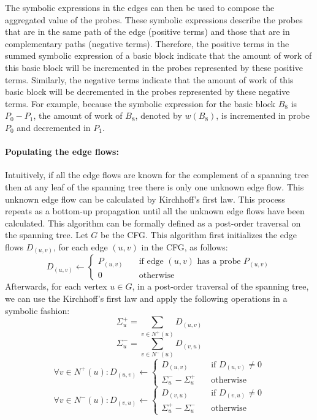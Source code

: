 The symbolic expressions in the edges can then be used to compose the aggregated
value of the probes.
These symbolic expressions describe the probes that are in the same path of the
edge (positive terms) and those that are in complementary paths (negative
terms).
Therefore, the positive terms in the summed symbolic expression of a
basic block indicate that the amount of work of this basic block will be
incremented in the probes represented by these positive terms.
Similarly, the negative terms indicate that the amount of work of this basic block
will be decremented in the probes represented by these negative terms.
For example, because the symbolic expression for the basic block $B_8$ is $P_0 - P_1$,
the amount of work of $B_8$, denoted by $w(B_8)$, is incremented in probe $P_0$
and decremented in $P_1$.

\paragraph{Populating the edge flows:}
Intuitively, if all the edge flows are known for the complement of a spanning tree then at any leaf of the spanning tree there is only one
unknown edge flow. This unknown edge flow can be calculated by Kirchhoff's first law\FIXME{\cite{}}. This process repeats as a bottom-up
propagation until all the unknown edge flows have been calculated. This algorithm can be formally defined as a post-order traversal on the
spanning tree. Let $G$ be the CFG. This algorithm first initializes the edge flows $D_{(u,v)}$, for each edge $(u,v)$ in the CFG, as
follows:
\[
D_{(u,v)} \gets
\begin{cases}
    P_{(u,v)} & \quad \text{if edge $(u,v)$ has a probe $P_{(u,v)}$}\\
    0       & \quad \text{otherwise}
\end{cases}
\]
Afterwards, for each vertex $u\in G$, in a post-order traversal of the spanning tree,
we can use the Kirchhoff's first law and apply the following operations
in a symbolic fashion:
\[
\Sigma^+_u = \sum_{v\in N^+(u)} D_{(u,v)}
\]
\[
\Sigma^-_u = \sum_{v\in N^-(u)} D_{(v,u)}
\]
\[
\forall v\in N^+(u):  D_{(u,v)} \gets
\begin{cases}
    D_{(u,v)} & \quad \text{if $D_{(u,v)}\neq 0$}\\
    \Sigma^-_u - \Sigma^+_u       & \quad \text{otherwise}
\end{cases}
\]
\[
\forall v\in N^-(u):  D_{(v,u)} \gets
\begin{cases}
    D_{(v,u)} & \quad \text{if $D_{(v,u)}\neq 0$}\\
    \Sigma^+_u - \Sigma^-_u       & \quad \text{otherwise}
\end{cases}
\]

